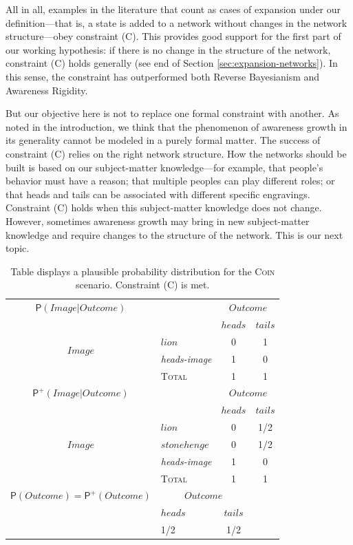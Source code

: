 \documentclass[
  11pt,
  dvipsnames,enabledeprecatedfontcommands, todos]{scrartcl}
\newcommand{\pr}[1]{\ensuremath{\mathsf{P}(#1)}}
\newcommand{\ppr}[2]{\ensuremath{\mathsf{P}^{#1}(#2)}}
\begin{document}
All in all, examples in the literature that count as cases of expansion
under our definition---that is, a state is added to a network without
changes in the network structure---obey constraint (C). This provides
good support for the first part of our working hypothesis: if there is
no change in the structure of the network, constraint (C) holds
generally (see end of Section \ref{sec:expansion-networks}). In this
sense, the constraint has outperformed both Reverse Bayesianism and
Awareness Rigidity.

But our objective here is not to replace one formal constraint with
another. As noted in the introduction, we think that the phenomenon of
awareness growth in its generality cannot be modeled in a purely formal
matter. The success of constraint (C) relies on the right network
structure. How the networks should be built is based on our
subject-matter knowledge---for example, that people's behavior must have
a reason; that multiple peoples can play different roles; or that heads
and tails can be associated with different specific engravings.
Constraint (C) holds when this subject-matter knowledge does not change.
However, sometimes awareness growth may bring in new subject-matter
knowledge and require changes to the structure of the network. This is
our next topic.

\begin{table}
\begin{tabular}{clcc}
$\pr{Image \vert Outcome}$ & & \multicolumn{2}{c}{$Outcome$} \\
 &   & $heads$ & $tails$ \\
\multirow{2}{*}{$Image$} & $lion$ & 0 & 1\\
& \textit{heads-image} & 1 & 0 \\
\hline
& \textsc{Total} & 1 & 1 \\
\hline
\hline
$\ppr{+}{Image \vert Outcome}$ & & \multicolumn{2}{c}{$Outcome$} \\
&  & $heads$ & $tails$ \\
\multirow{3}{*}{$Image$} & $lion$ & 0 & 1/2\\ 
& $stonehenge$ & 0 & 1/2 \\
& \textit{heads-image} & 1 & 0 \\
\hline
& \textsc{Total} & 1 & 1 \\
\hline
\hline
$\pr{Outcome}=\ppr{+}{Outcome}$ & \multicolumn{2}{c}{$Outcome$} & \\
&  $heads$ & $tails$ & \\
& 1/2 & 1/2 & \\
\end{tabular}
\caption{Table displays a plausible probability distribution for the \textsc{Coin} scenario. Constraint (C) is met.}
\label{table:coin}
\end{table}
\end{document}
